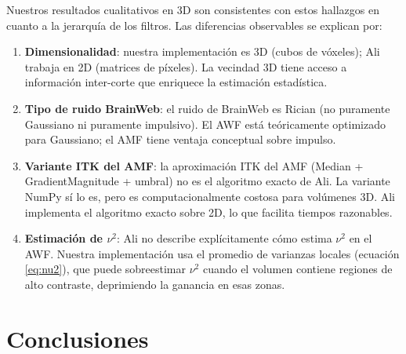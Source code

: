 \documentclass[12pt, a4paper]{article}
\begin{document}
Nuestros resultados cualitativos en 3D son consistentes con estos hallazgos en cuanto a
la jerarquía de los filtros. Las diferencias observables se explican por:

\begin{enumerate}
  \item \textbf{Dimensionalidad}: nuestra implementación es 3D (cubos de vóxeles); Ali
        trabaja en 2D (matrices de píxeles). La vecindad 3D tiene acceso a información
        inter-corte que enriquece la estimación estadística.
  \item \textbf{Tipo de ruido BrainWeb}: el ruido de BrainWeb es Rician (no puramente
        Gaussiano ni puramente impulsivo). El AWF está teóricamente optimizado para
        Gaussiano; el AMF tiene ventaja conceptual sobre impulso.
  \item \textbf{Variante ITK del AMF}: la aproximación ITK del AMF (Median +
        GradientMagnitude + umbral) no es el algoritmo exacto de Ali. La variante NumPy
        sí lo es, pero es computacionalmente costosa para volúmenes 3D. Ali implementa
        el algoritmo exacto sobre 2D, lo que facilita tiempos razonables.
  \item \textbf{Estimación de $\nu^2$}: Ali no describe explícitamente cómo estima
        $\nu^2$ en el AWF. Nuestra implementación usa el promedio de varianzas locales
        (ecuación \ref{eq:nu2}), que puede sobreestimar $\nu^2$ cuando el volumen
        contiene regiones de alto contraste, deprimiendo la ganancia en esas zonas.
\end{enumerate}

\section{Conclusiones}
\end{document}
